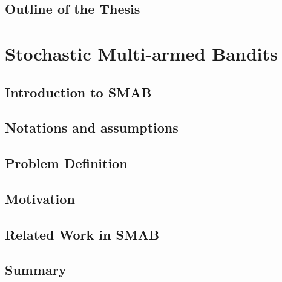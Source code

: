 \documentclass[MS,twoside]{iitmdiss}
\newcommand{\clearemptydoublepage}{\newpage{\cleardoublepage}}
\begin{document}
\section{Outline of the Thesis}
\label{outline}




\clearemptydoublepage
\chapter{Stochastic Multi-armed Bandits}
\label{chap:SMAB}

\section{Introduction to SMAB}
\label{sec:intro}


\section{Notations and assumptions}
\label{sec:notations}


\section{Problem Definition}
\label{sec:probDef}


\section{Motivation}
\label{sec:motivation}


\section{Related Work in SMAB}
\label{sec:related}


\newpage
\section{Summary}
\label{chap2:conc}






\clearemptydoublepage
\end{document}
